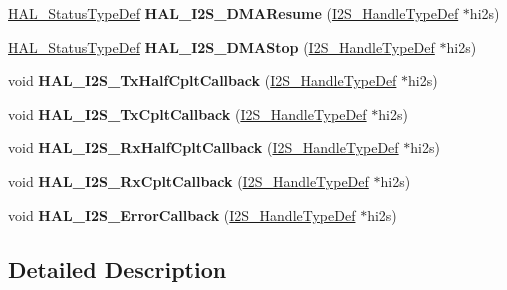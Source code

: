\begin{DoxyCompactItemize}
\hyperlink{stm32f4xx__hal__def_8h_a63c0679d1cb8b8c684fbb0632743478f}{H\+A\+L\+\_\+\+Status\+Type\+Def} {\bfseries H\+A\+L\+\_\+\+I2\+S\+\_\+\+D\+M\+A\+Resume} (\hyperlink{group___i2_s___exported___types_ga859f888192a094b456619601937580f5}{I2\+S\+\_\+\+Handle\+Type\+Def} $\ast$hi2s)
\item 
\mbox{\label{group___i2_s___exported___functions___group2_gae8d79cd1625530f161cd6651ef5135a3}} 
\hyperlink{stm32f4xx__hal__def_8h_a63c0679d1cb8b8c684fbb0632743478f}{H\+A\+L\+\_\+\+Status\+Type\+Def} {\bfseries H\+A\+L\+\_\+\+I2\+S\+\_\+\+D\+M\+A\+Stop} (\hyperlink{group___i2_s___exported___types_ga859f888192a094b456619601937580f5}{I2\+S\+\_\+\+Handle\+Type\+Def} $\ast$hi2s)
\item 
\mbox{\label{group___i2_s___exported___functions___group2_ga5bef3c73683b81e822368c9029e495bc}} 
void {\bfseries H\+A\+L\+\_\+\+I2\+S\+\_\+\+Tx\+Half\+Cplt\+Callback} (\hyperlink{group___i2_s___exported___types_ga859f888192a094b456619601937580f5}{I2\+S\+\_\+\+Handle\+Type\+Def} $\ast$hi2s)
\item 
\mbox{\label{group___i2_s___exported___functions___group2_ga1ef4021384eddbd41ca60454a2483bf3}} 
void {\bfseries H\+A\+L\+\_\+\+I2\+S\+\_\+\+Tx\+Cplt\+Callback} (\hyperlink{group___i2_s___exported___types_ga859f888192a094b456619601937580f5}{I2\+S\+\_\+\+Handle\+Type\+Def} $\ast$hi2s)
\item 
\mbox{\label{group___i2_s___exported___functions___group2_ga6c4cd3b18c42c6de0c3f4fe7068a5b12}} 
void {\bfseries H\+A\+L\+\_\+\+I2\+S\+\_\+\+Rx\+Half\+Cplt\+Callback} (\hyperlink{group___i2_s___exported___types_ga859f888192a094b456619601937580f5}{I2\+S\+\_\+\+Handle\+Type\+Def} $\ast$hi2s)
\item 
\mbox{\label{group___i2_s___exported___functions___group2_ga18c33b2d429b06674ec30e5b2b81862c}} 
void {\bfseries H\+A\+L\+\_\+\+I2\+S\+\_\+\+Rx\+Cplt\+Callback} (\hyperlink{group___i2_s___exported___types_ga859f888192a094b456619601937580f5}{I2\+S\+\_\+\+Handle\+Type\+Def} $\ast$hi2s)
\item 
\mbox{\label{group___i2_s___exported___functions___group2_ga8ca0ebeda8edc26d4201fe8657be294e}} 
void {\bfseries H\+A\+L\+\_\+\+I2\+S\+\_\+\+Error\+Callback} (\hyperlink{group___i2_s___exported___types_ga859f888192a094b456619601937580f5}{I2\+S\+\_\+\+Handle\+Type\+Def} $\ast$hi2s)
\end{DoxyCompactItemize}


\subsection{Detailed Description}
